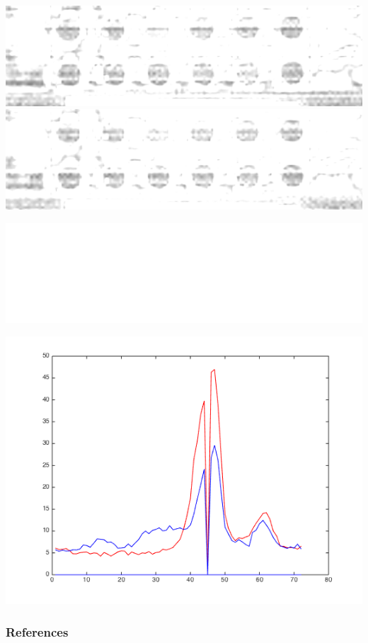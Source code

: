 \documentclass{beamer}
\begin{document}
\begin{frame}
        \includegraphics[height=0.023\textheight]{spatial-denoised/wavelet_den_71.png}
        \includegraphics[height=0.023\textheight]{spatial-denoised/wavelet_den_72.png}

        \vspace{1mm}
        \includegraphics[scale=0.1]{spatial-denoised/wavelet_den_45.png}

        \vspace{1mm}
        \includegraphics[scale=0.25]{contrastAgentResponses1.png} 

\end{frame}


\begin{frame}
    \frametitle{References}
\end{frame}
\end{document}

